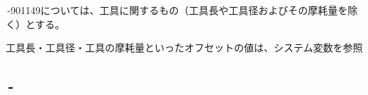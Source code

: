 \clearpage
\,-\ttNum901149については、工具に関するもの（工具長や工具径およびその摩耗量を除く）とする。
\begin{hosoku}
工具長・工具径・工具の摩耗量といったオフセットの値は、システム変数を参照
\end{hosoku}

\subsection{\,-}

